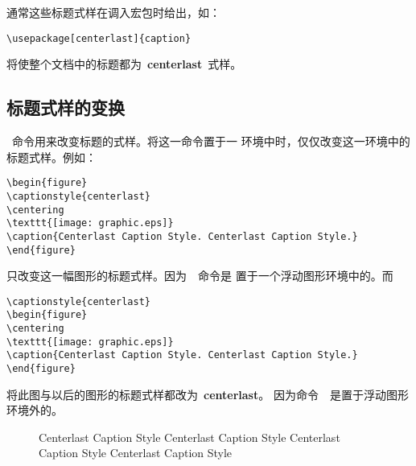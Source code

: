通常这些标题式样在调入宏包时给出，如：
\begin{Verbatim}[xleftmargin=1cm]
\usepackage[centerlast]{caption}
\end{Verbatim}
将使整个文档中的标题都为~\textbf{centerlast}~式样。

\subsection{标题式样的变换}\label{ssec:changestyle}

~命令用来改变标题的式样。将这一命令置于一
环境中时，仅仅改变这一环境中的标题式样。例如：
\begin{Verbatim}[xleftmargin=1cm]
\begin{figure} 
\captionstyle{centerlast} 
\centering 
\texttt{[image: graphic.eps]} 
\caption{Centerlast Caption Style. Centerlast Caption Style.} 
\end{figure}
\end{Verbatim}
只改变这一幅图形的标题式样。因为~~命令是
置于一个浮动图形环境中的。而
\begin{Verbatim}[xleftmargin=1cm]
\captionstyle{centerlast} 
\begin{figure} 
\centering 
\texttt{[image: graphic.eps]} 
\caption{Centerlast Caption Style. Centerlast Caption Style.} 
\end{figure}
\end{Verbatim}
将此图与以后的图形的标题式样都改为~\textbf{centerlast}。
因为命令~~是置于浮动图形环境外的。

\begin{figure}
	\begin{center}
		\begin{minipage}[t]{.3\textwidth}
			\vspace{0pt}
			\setcaptionmargin{5pt}
			\centering
			\resizebox{4cm}{!}{\usebox{\graphic}}
			\caption{Normal Caption Style Normal Caption Style Normal Caption Style 
				Normal Caption Style}\label{fig:normalcap}
		\end{minipage}%
		\begin{minipage}[t]{.3\textwidth}
			\vspace{0pt}
			\setcaptionmargin{5pt}
			\centering
			\resizebox{4cm}{!}{\usebox{\graphic}}
			\caption{Center Caption Style Center Caption Style
				Center Caption Style Center Caption Style}\label{fig:centercap}
		\end{minipage}%
		\begin{minipage}[t]{.3\textwidth}
			\vspace{0pt}
			\setcaptionmargin{5pt}
			\centering
			\resizebox{4cm}{!}{\usebox{\graphic}}
			\caption{Centerlast Caption Style Centerlast Caption Style 
				Centerlast Caption Style Centerlast Caption Style}\label{fig:clastcap}
		\end{minipage}
	\end{center}
\end{figure}

